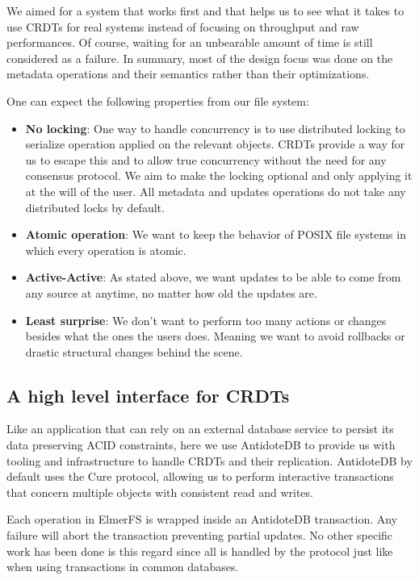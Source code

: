 \documentclass[sigplan, 10pt]{acmart}
\begin{document}
We aimed for a system that works first and that helps us to see what it takes
to use CRDTs for real systems instead of focusing on throughput and raw performances.
Of course, waiting for an unbearable amount of time is still considered as a failure.
In summary, most of the design focus was done on the metadata operations
and their semantics rather than their optimizations.

One can expect the following properties from our file system:

\begin{itemize}
    \item \textbf{No locking}: One way to handle concurrency is to use distributed locking
    to serialize operation applied on the relevant objects. CRDTs provide a way for us to escape
    this and to allow true concurrency without the need for any consensus protocol.
    We aim to make the locking optional and only applying it at the will of the user.
    All metadata and updates operations do not take any distributed
    locks by default.
    \item \textbf{Atomic operation}: We want to keep the behavior of POSIX file systems
    in which every operation is atomic.
    \item \textbf{Active-Active}: As stated above, we want updates to be able to
    come from any source at anytime, no matter how old the updates are.
    \item \textbf{Least surprise}: We don't want to perform too many actions
      or changes besides what the ones the users does. Meaning we want to
      avoid rollbacks or drastic structural changes behind the scene.
\end{itemize}

\subsection{A high level interface for CRDTs}

Like an application that can rely on an external database service to persist its
data preserving ACID constraints, here we use AntidoteDB to provide us with
tooling and infrastructure to handle CRDTs and their replication.
AntidoteDB by default uses the Cure protocol, allowing us to perform interactive
transactions that concern multiple objects with consistent read and writes.

Each operation in ElmerFS is wrapped inside an AntidoteDB
transaction. Any failure will abort the transaction preventing partial updates.
No other specific work has been done is this regard since all is handled
by the protocol just like when using transactions in common databases.
\end{document}
